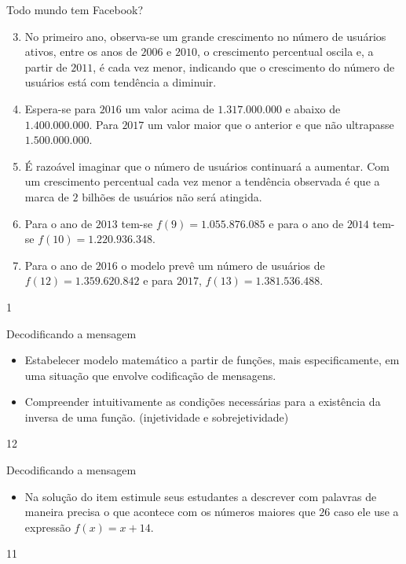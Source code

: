 \mspace{.25em}
\begin{answer}{Todo mundo tem Facebook?}
{
\begin{enumerate}\setcounter{enumi}{2}
\item No primeiro ano, observa-se um grande crescimento no número de usuários ativos, entre os anos de $2006$ e $2010$, o crescimento percentual oscila e, a partir de $2011$, é cada vez menor, indicando que o crescimento do número de usuários está com tendência a diminuir.

\item Espera-se para $2016$ um valor acima de $1.317.000.000$ e abaixo de $1.400.000.000$. Para $2017$ um valor maior que o anterior e que não ultrapasse $1.500.000.000$.

\item É razoável imaginar que o número de usuários continuará a aumentar. Com um crescimento percentual cada vez menor a tendência observada é que a marca de $2$ bilhões de usuários não será atingida.

\item Para o ano de $2013$ tem-se $f(9)=1.055.876.085$ e para o ano de $2014$ tem-se $f(10)=1.220.936.348$.

\item Para o ano de $2016$ o modelo prevê um número de usuários de $f(12)=1.359.620.842$ e para $2017$, $f(13)=1.381.536.488$.

\end{enumerate}
}{1}
\end{answer}
\begin{objectives}{Decodificando a mensagem}
{
\begin{itemize}

\item Estabelecer modelo matemático a partir de funções, mais especificamente, em uma situação que envolve codificação de mensagens.

\item Compreender intuitivamente as condições necessárias para a existência da inversa de uma função. (injetividade e sobrejetividade)

\end{itemize}
}{1}{2}
\end{objectives}
\begin{sugestions}{Decodificando a mensagem}
{
\begin{itemize}
\item Na solução do item  estimule seus estudantes a descrever com palavras de maneira precisa o que acontece com os números maiores que $26$ caso ele use a expressão $f(x)=x+14$.
\end{itemize}
}{1}{1}
\end{sugestions}
